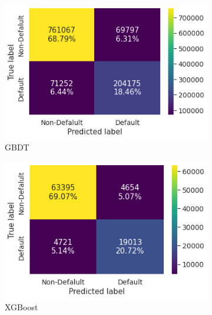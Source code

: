 \documentclass[twoside,11pt,a4paper]{article}
\begin{document}
\begin{figure}[h!]
\begin{subfigure}{0.4 \textwidth}
		\includegraphics[width=1\linewidth, height=0.8\linewidth]{cm_gbdt}
		\caption[Gradient Boosting Decision Tree]{\acs{GBDT}}
		\label{fig:cm_gbdt}
	\end{subfigure}
	\hfill
	\begin{subfigure}{0.4 \textwidth}
		\includegraphics[width=1\linewidth, height=0.8\linewidth]{cm_xgboost}
		\caption[eXtreme Gradient Boosting Decision Tree]{\acs{XGBoost}}
		\label{fig:cm_xgboost}
	\end{subfigure}
	\begin{subfigure}{0.4 \textwidth}

\end{subfigure}
\end{figure}
\end{document}

